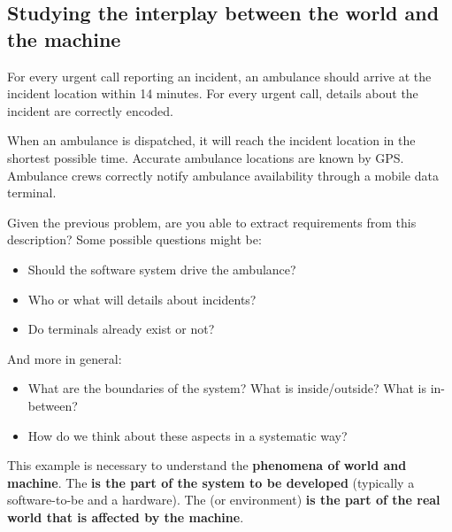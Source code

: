 \subsection{Studying the interplay between the world and the machine}

\begin{examplebox}\label{example: ambulance dispatching system}
    For every urgent call reporting an incident, an ambulance should arrive at the incident location within 14 minutes. For every urgent call, details about the incident are correctly encoded.

    When an ambulance is dispatched, it will reach the incident location in the shortest possible time. Accurate ambulance locations are known by GPS. Ambulance crews correctly notify ambulance availability through a mobile data terminal.

    \highspace
    Given the previous problem, are you able to extract requirements from this description? Some possible questions might be:
    \begin{itemize}
        \item Should the software system drive the ambulance?

        \item Who or what will  details about incidents?
        
        \item Do terminals already exist or not?
    \end{itemize}
    And more in general:
    \begin{itemize}
        \item What are the boundaries of the system? What is inside/outside? What is in-between?

        \item How do we think about these aspects in a systematic way?
    \end{itemize}
\end{examplebox}

\noindent
This example is necessary to understand the \textbf{phenomena of world and machine}. The  \textbf{is the part of the system to be developed} (typically a software-to-be and a hardware). The  (or environment) \textbf{is the part of the real world that is affected by the machine}.

